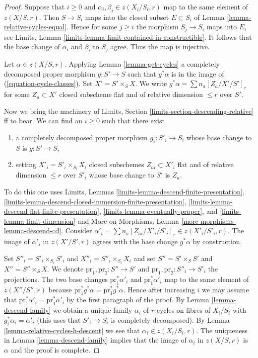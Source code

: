 \documentclass{stacks-project}
\theoremstyle{plain}
\theoremstyle{definition}
\theoremstyle{remark}
\numberwithin{equation}{subsection}
\begin{document}
\begin{proof}
Suppose that $i \geq 0$ and $\alpha_i, \beta_i \in z(X_i/S_i, r)$
map to the same element of $z(X/S, r)$. Then $S \to S_i$
maps into the closed subset $E \subset S_i$ of
Lemma \ref{lemma-relative-cycles-equal}.
Hence for some $j \geq i$ the morphism $S_j \to S_i$
maps into $E$, see Limits, Lemma
\ref{limits-lemma-limit-contained-in-constructible}.
It follows that the base change of
$\alpha_i$ and $\beta_i$ to $S_j$ agree. Thus the map is injective.

\medskip\noindent
Let $\alpha \in z(X/S, r)$. Applying Lemma \ref{lemma-get-cycles}
a completely decomposed proper morphism $g : S' \to S$ such that $g^*\alpha$
is in the image of (\ref{equation-cycle-classes}).
Set $X' = S' \times_S X$. We write $g^*\alpha = \sum n_a [Z_a/X'/S']_r$
for some $Z_a \subset X'$ closed subscheme
flat and of relative dimension $\leq r$ over $S'$.

\medskip\noindent
Now we bring the machinery of
Limits, Section \ref{limits-section-descending-relative} ff to bear.
We can find an $i \geq 0$ such that there exist
\begin{enumerate}
\item a completely decomposed proper morphism $g_i : S'_i \to S_i$
whose base change to $S$ is $g : S' \to S$,
\item setting $X'_i = S'_i \times_{S_i} X_i$
closed subschemes $Z_{ai} \subset X'_i$ flat and of
relative dimension $\leq r$ over $S'_i$ whose base change to $S'$
is $Z_a$.
\end{enumerate}
To do this one uses Limits, Lemmas
\ref{limits-lemma-descend-finite-presentation},
\ref{limits-lemma-descend-closed-immersion-finite-presentation},
\ref{limits-lemma-descend-flat-finite-presentation},
\ref{limits-lemma-eventually-proper}, and
\ref{limits-lemma-limit-dimension}
and More on Morphisms, Lemma
\ref{more-morphisms-lemma-descend-cd}.
Consider
$\alpha'_i = \sum n_a [Z_{ai}/X'_i/S'_i]_r \in z(X'_i/S'_i, r)$.
The image of $\alpha'_i$ in $z(X'/S', r)$ agrees with the base change
$g^*\alpha$ by construction.

\medskip\noindent
Set $S''_i = S'_i \times_{S_i} S'_i$ and $X''_i = S''_i \times_{S_i} X_i$
and set $S'' = S' \times_S S'$ and $X'' = S'' \times_S X$.
We denote $\text{pr}_1, \text{pr}_2 : S'' \to S'$ and
$\text{pr}_1, \text{pr}_2 : S''_i \to S'_i$ the projections.
The two base changes $\text{pr}_1^*\alpha'_i$ and $\text{pr}_1^*\alpha'_i$
map to the same element of $z(X''/S'', r)$ because
$\text{pr}_1^*g^*\alpha = \text{pr}_1^*g^*\alpha$.
Hence after increasing $i$ we may assume that
$\text{pr}_1^*\alpha'_i = \text{pr}_1^*\alpha'_i$
by the first paragraph of the proof.
By Lemma \ref{lemma-descend-family}
we obtain a unique family $\alpha_i$
of $r$-cycles on fibres of $X_i/S_i$
with $g_i^*\alpha_i = \alpha'_i$ (this uses that $S'_i \to S_i$
is completely decomposed).
By Lemma \ref{lemma-relative-cycles-h-descent}
we see that $\alpha_i \in z(X_i/S_i, r)$.
The uniqueness in Lemma \ref{lemma-descend-family} implies that the
image of $\alpha_i$ in $z(X/S, r)$ is $\alpha$ and the proof is complete.
\end{proof}
\end{document}
